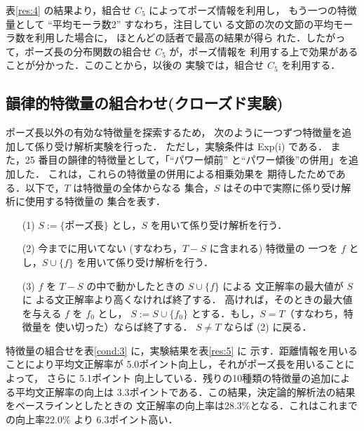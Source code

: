 表\ref{res:4} の結果より，組合せ $C_5$ によってポーズ情報を利用し，
もう一つの特徴量として ``平均モーラ数2'' すなわち，注目してい
る文節の次の文節の平均モーラ数を利用した場合に，
ほとんどの話者で最高の結果が得ら
れた．したがって，ポーズ長の分布関数の組合せ $C_5$ が，ポーズ情報を
利用する上で効果があることが分かった．このことから，以後の
実験では，組合せ $C_5$ を利用する．

\subsection{韻律的特徴量の組合わせ(クローズド実験)}
ポーズ長以外の有効な特徴量を探索するため，
次のように一つずつ特徴量を追加して係り受け解析実験を行った．
ただし，実験条件は Exp(i) である．
また，25 番目の韻律的特徴量として，「``パワー傾前''
と``パワー傾後''の併用」を追加した．
これは，これらの特徴量の併用による相乗効果を
期待したためである．以下で，$T$ は特徴量の全体からなる
集合，$S$ はその中で実際に係り受け解析に使用する特徴量の
集合を表す．
\vspace{5mm}
\begin{itemize}
\item[(1)] $S:= \{\mbox{ポーズ長}\}$ とし，$S$ を用いて係り受け解析を行う．
\item[(2)] 今までに用いてない (すなわち，$T-S$ に含まれる) 特徴量の
一つを $f$ とし，$S \cup \{f\}$ を用いて係り受け解析を行う．
\item[(3)] $f$ を $T-S$ の中で動かしたときの $S\cup \{f\}$ による
文正解率の最大値が $S$ に
よる文正解率より高くなければ終了する．
高ければ，そのときの最大値を与える $f$ を $f_{0}$ とし，
$S:= S \cup \{f_{0}\}$ とする．もし，$S= T$（すなわち，特徴量を
使い切った）ならば終了する．
$S \not = T$ ならば (2) に戻る．
\end{itemize}
\vspace{5mm}
特徴量の組合せを表\ref{cond:3} に，実験結果を表\ref{res:5} に
示す．距離情報を用いることにより平均文正解率が
5.0ポイント向上し，それがポーズ長を用いることによって，
さらに 5.1ポイント
向上している．残りの10種類の特徴量の追加による平均文正解率の向上は
3.3ポイントである．この結果，決定論的解析法の結果をベースラインとしたときの
文正解率の向上率は28.3\%となる．これはこれまでの向上率22.0\% 
\cite{KOU-1,OZE-4}より
6.3ポイント高い．

